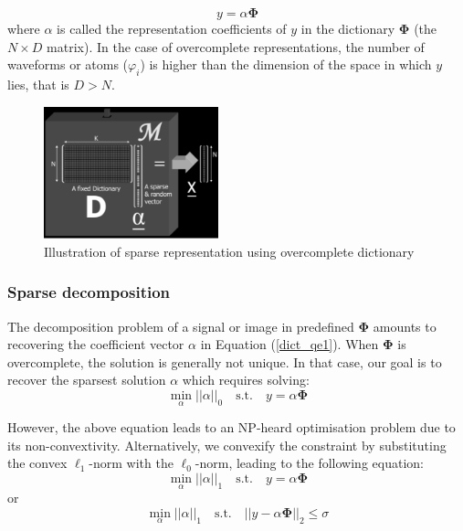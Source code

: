 \begin{equation}
    y = \alpha \mathbf{\Phi}
    \label{dict_qe1}
\end{equation}
where $\alpha$ is called the representation coefficients of $y$ in the dictionary $\mathbf{\Phi}$
(the $N \times D$ matrix). 
In the case of overcomplete representations, the number of waveforms or atoms ($\varphi_i$) is higher than the dimension of the space in which $y$ lies, that is $D > N$. 

\begin{figure}[!htbp]
\centering
\includegraphics[width=0.45\textwidth]{images/dictionary_sparse.png}
\caption{Illustration of sparse representation using overcomplete dictionary}
\label{dic1}
\end{figure}

\subsubsection{Sparse decomposition}
\label{BSS_sparse_decomp}
The decomposition problem of a signal or image in predefined $\mathbf{\Phi}$ amounts to recovering the coefficient vector $\alpha$ in Equation (\ref{dict_qe1}). When $\mathbf{\Phi}$ is overcomplete, the solution is generally not unique. In that case, our goal is to recover the sparsest solution $\alpha$ which requires solving:
\begin{equation}
    \min_{\alpha}||\alpha||_0 \quad \text{s.t.} \quad y = \alpha \mathbf{\Phi}
\end{equation}

However, the above equation leads to an NP-heard optimisation problem due to its non-convextivity. Alternatively, we convexify the constraint by substituting the convex $\ell_1$-norm with the $\ell_0$-norm, leading to the following equation:
\begin{equation}
    \min_{\alpha} ||\alpha||_1 \quad \text{s.t.} \quad y = \alpha \mathbf{\Phi} 
    \label{l1_sparse}
\end{equation}
or\\
\begin{equation}
    \min_{\alpha}||\alpha||_1 \quad \text{s.t.} \quad || y - \alpha \mathbf{\Phi}||_2 \leq \sigma
\end{equation}


